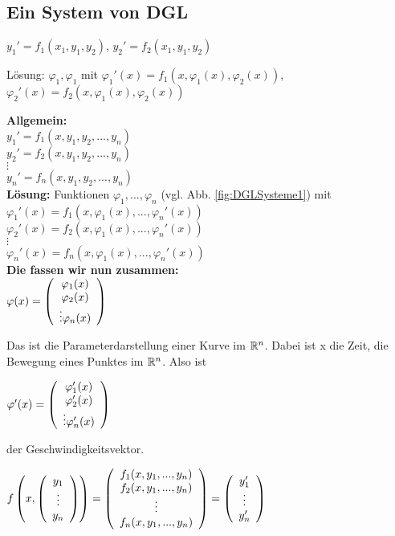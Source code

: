 \renewcommand{\ldate}{2015-11-27}

\subsection{Ein System von DGL}
$y_1' = f_1(x_1, y_1, y_2) $, 
$y_2' = f_2(x_1, y_1, y_2) $

Lösung: 
$\varphi_1, \varphi_1$ mit 
$\varphi_1'(x) = f_1(x,\varphi_1(x),\varphi_2(x))$,
$\varphi_2'(x) = f_2(x,\varphi_1(x),\varphi_2(x))$

\textbf{Allgemein:}\\
$y_1' = f_1(x,y_1,y_2,...,y_n)$\\
$y_2' = f_2(x,y_1,y_2,...,y_n)$\\
$\vdots$\\
$y_n' = f_n(x,y_1,y_2,...,y_n)$\\

\textbf{Lösung:} Funktionen $\varphi_1, ..., \varphi_n$ (vgl. Abb. \ref{fig:DGLSysteme1}) mit \\
$\varphi_1'(x) = f_1(x, \varphi_1(x), ..., \varphi_n'(x))$\\ 
$\varphi_2'(x) = f_2(x, \varphi_1(x), ..., \varphi_n'(x))$\\ 
$\vdots$\\
$\varphi_n'(x) = f_n(x, \varphi_1(x), ..., \varphi_n'(x))$\\

\textbf{Die fassen wir nun zusammen:}\\
$ \varphi(x) =   \left(  \begin{array}{c} \varphi_1(x)\\\varphi_2(x)\\\vdots\varphi_n(x) \end{array}  \right)  $ 

Das ist die Parameterdarstellung einer Kurve im $\mathbb{R}^n$. Dabei ist x die Zeit, die Bewegung eines Punktes im $\mathbb{R}^n$. Also ist 

$\varphi'(x) =   \left(  \begin{array}{c} \varphi_1'(x)\\\varphi_2'(x)\\\vdots\varphi_n'(x) \end{array}  \right)  $

der Geschwindigkeitsvektor. 

$f \left( x,   \left(  \begin{array}{c} y_1\\\vdots\\y_n \end{array}  \right)   \right)  =   \left(  \begin{array}{c} f_1(x,y_1,...,y_n)\\f_2(x,y_1,...,y_n)\\\vdots\\f_n(x,y_1,...,y_n)\\ \end{array}  \right)   =   \left(  \begin{array}{c} y_1'\\\vdots\\y_n'\\ \end{array}  \right)  $

